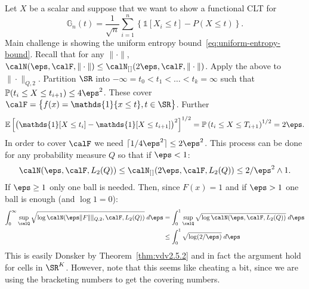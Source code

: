 \begin{example}
	\label{ex:cells-donsker}
	Let \(X\) be a scalar and suppose that we want to show a functional CLT for
	 \[
		 \mathbb{G}_n(t) = \frac{1}{\sqrt n}\sum_{i=1}^n \left\{\mathds{1}[X_i\leq t]-P(X\leq t)\right\} 
	.\]
	Main challenge is showing the uniform entropy bound~\eqref{eq:uniform-entropy-bound}. Recall that for any \(\|\cdot\|\), \(\calN(\eps,\calF,\|\cdot\|)\leq \calN_{[\hspace{0.1em}]}(2\eps,\calF,\|\cdot\|)\). Apply the above to \(\|\cdot\|_{Q,2}\). Partition \(\SR\) into  \(-\infty=t_0<t_1<\dots<t_k= \infty\) such that \(\P(t_i\leq X\leq t_{i+1}) \leq 4\eps^2\). These cover \(\calF= \left\{f(x)=\mathds{1}\{x\leq t\}, t\in\SR \right\}\). Further
	\[
		\E\left[\left(\mathds{1}[X\leq t_i]-\mathds{1}[X\leq t_{i+1}]\right)^2\right]^{1/2} = \P\left(t_i\leq X\leq T_{i+1}\right)^{1/2} = 2\eps
	.\]
	In order to cover \(\calF\) we need  \(\lceil 1/4\eps^2\rceil \leq 2\eps^2\). This process can be done for any probability measure \(Q\) so that if \(\eps < 1\):
	 \[
		 \calN(\eps,\calF,L_2(Q)) \leq  \calN_{[\hspace{0.1em}]}(2\eps,\calF,L_2(Q)) \leq 2/\eps^2  \wedge 1
	.\]
	If \(\eps \geq 1\) only one ball is needed. Then, since \(F(x)=1\) and if  \(\eps>1\) one ball is enough (and \(\log 1 =0\)):
	\begin{align*}
		\int_{0}^{\infty} \sup_{\calQ} \sqrt{\log\calN(\eps\|F\|\|_{Q,2},\calF,L_2(Q))}\;d\eps &= \int_{0}^{1} \sup_{\calQ}\sqrt{\log\calN(\eps,\calF,L_2(Q))}\;d\eps \\
											 &\leq \int_{0}^{1} \sqrt{\log (2/\eps)}\;d\eps 
	\end{align*}
	This is easily Donsker by Theorem~\ref{thm:vdv2.5.2} and in fact the argument hold for cells in \(\SR^K\). However, note that this seems like cheating a bit, since we are using the bracketing numbers to get the covering numbers.
\end{example}

